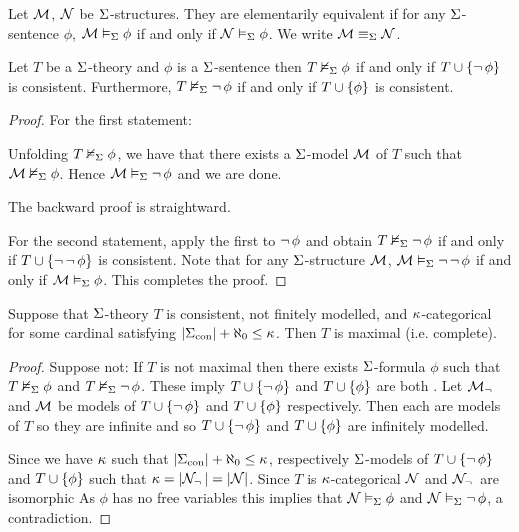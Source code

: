 \begin{dfn}
    Let $\mathcal{M}$, $\mathcal{N}$ be $\Sigma$-structures.
    They are elementarily equivalent if for any $\Sigma$-sentence $\phi$,
    $\mathcal{M} \vDash_{\Sigma} \phi$ if and only if $\mathcal{N} \vDash_{\Sigma} \phi$.
    We write $\mathcal{M} \equiv_\Sigma \mathcal{N}$.
\end{dfn}

\begin{lem}
    Let $T$ be a $\Sigma$-theory
    and $\phi$ is a $\Sigma$-sentence
    then $T \nvDash_{\Sigma} \phi$
    if and only if $T \cup \left\{ \neg\, \phi\right\}$ is consistent.
    Furthermore, $T \nvDash_{\Sigma} \neg\, \phi$
    if and only if $T \cup \left\{\phi\right\}$ is consistent.
\end{lem}
\begin{proof}
    For the first statement:
    \begin{forward}
        Unfolding $T \nvDash_{\Sigma} \phi$,
        we have that there exists a $\Sigma$-model $\mathcal{M}$ of $T$ 
        such that $\mathcal{M} \nvDash_{\Sigma} \phi$.
        Hence $\mathcal{M} \vDash_{\Sigma} \neg\, \phi$ and we are done.
    \end{forward}
    The backward proof is straightward.

    For the second statement, 
    apply the first to $\neg\, \phi$ and obtain 
    $T \nvDash_{\Sigma} \neg\, \phi$
    if and only if $T \cup \left\{\neg\, \neg\, \phi\right\}$ is consistent.
    Note that for any $\Sigma$-structure $\mathcal{M}$, 
    $\mathcal{M} \vDash_{\Sigma} \neg\, \neg\, \phi$ 
    if and only if $\mathcal{M} \vDash_{\Sigma} \phi$.
    This completes the proof.
\end{proof}

\begin{prop}
    Suppose that $\Sigma$-theory $T$ is consistent, 
    not finitely modelled, and $\kappa$-categorical 
    for some cardinal satisfying 
    $|{\Sigma}_\mathrm{con}| + \aleph_0 \leq \kappa$.
    Then $T$ is maximal (i.e. complete).
\end{prop}
\begin{proof}
    Suppose not: If $T$ is not maximal then there exists
    $\Sigma$-formula $\phi$ such that $T \nvDash_{\Sigma} \phi$ and 
    $T \nvDash_{\Sigma} \neg\, \phi$.
    These imply $T \cup \left\{\neg\, \phi\right\}$
    and $T \cup \left\{\phi\right\}$ are both
    .
    Let $\mathcal{M}_\neg\,$ and $\mathcal{M}$ be models of  
    $T \cup \left\{\neg\, \phi\right\}$ and $T \cup \left\{\phi\right\}$
    respectively.
    Then each are models of $T$ so they are infinite
    and so $T \cup \left\{\neg\, \phi\right\}$ and $T \cup \left\{\phi\right\}$
    are infinitely modelled.

    Since we have $\kappa$ such that $|{\Sigma}_\mathrm{con}| + \aleph_0 \leq \kappa$, 
     respectively $\Sigma$-models of 
        $T \cup \left\{\neg\, \phi\right\}$ and $T \cup \left\{\phi\right\}$
        such that 
        $\kappa = |{\mathcal{N}_\neg\,}| = |{\mathcal{N}}|$.
    Since $T$ is $\kappa$-categorical
    $\mathcal{N}$ and $\mathcal{N}_\neg\,$ are isomorphic
    As $\phi$ has no free variables this implies that
    $\mathcal{N} \vDash_{\Sigma} \phi$ and $\mathcal{N} \vDash_{\Sigma} \neg\, \phi$, 
    a contradiction.
\end{proof}

